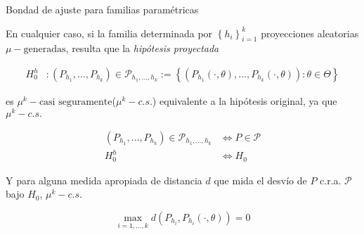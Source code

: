 \documentclass[10pt,spanish]{beamer}\usepackage[]{graphicx}\usepackage[]{color}
\begin{document}
%
\begin{frame}{Bondad de ajuste para familias paramétricas}

En cualquier caso, si la familia determinada por $\left\{ h_{i}\right\} _{i=1}^{k}$
proyecciones aleatorias $\mu-\text{generadas}$, resulta que la \emph{hipótesis
proyectada}

\vspace{-15pt}

\begin{align*}
H_{0}^{h} & :\left(P_{h_{1}},\ldots,P_{h_{k}}\right)\in\mathcal{P}_{h_{1},\ldots,h_{k}}:=\left\{ \left(P_{h_{1}}(\cdot,\theta),\ldots,P_{h_{k}}(\cdot,\theta)\right):\theta\in\Theta\right\} 
\end{align*}


\pause{}

es $\mu^{k}-\text{casi seguramente}$($\mu^{k}-c.s.$) equivalente
a la hipótesis original, ya que $\mu^{k}-c.s.$

\vspace{-15pt}

\begin{align*}
\left(P_{h_{1}},\ldots,P_{h_{k}}\right)\in\mathcal{P}_{h_{1},\ldots,h_{k}} & \iff P\in\mathcal{P}\\
H_{0}^{h} & \iff H_{0}
\end{align*}


\pause{}

Y para alguna medida apropiada de distancia $d$ que mida el desvío
de $P$ c.r.a. $\mathcal{P}$ bajo $H_{0}$, $\mu^{k}-c.s.$

\vspace{-15pt}

\[
\max_{i=1,\ldots,k}d\left(P_{h_{i}},P_{h_{i}}(\cdot,\theta)\right)=0
\]

\end{frame}
%
\end{document}
